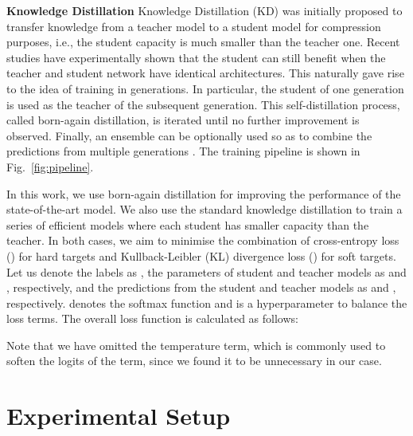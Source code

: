 \documentclass{article}
\begin{document}
\noindent\textbf{Knowledge Distillation}\quad
Knowledge Distillation (KD) \cite{hinton2014distilling} was initially proposed to transfer knowledge from a teacher model to a student model for compression purposes, i.e., the student capacity is much smaller than the teacher one. Recent studies \cite{furlanello2018born, bagherinezhad2018label, yang2018knowledge} have experimentally shown that the student can still benefit when the teacher and student network have identical architectures. This naturally gave rise to the idea of training in generations. In particular, the student of one generation is used as the teacher of the subsequent generation. This self-distillation process, called born-again distillation, is iterated until no further improvement is observed. Finally, an ensemble can be optionally used so as to combine the predictions from multiple generations \cite{furlanello2018born}. The training pipeline is shown in Fig.~\ref{fig:pipeline}. 


In this work, we use born-again distillation for improving the performance of the state-of-the-art model. We also use the standard knowledge distillation to train a series of efficient models where each student has smaller capacity than the teacher. In both cases, we aim to minimise the combination of cross-entropy loss () for hard targets and Kullback-Leibler (KL) divergence loss () for soft targets. Let us denote the labels as , the parameters of student and teacher models as  and , respectively, and the predictions from the student and teacher models as  and , respectively.  denotes the softmax function and  is a hyperparameter to balance the loss terms. The overall loss function is calculated as follows:


Note that we have omitted the temperature term, which is commonly used to soften the logits of the  term, since we found it to be unnecessary in our case.




\section{Experimental Setup}
\end{document}
